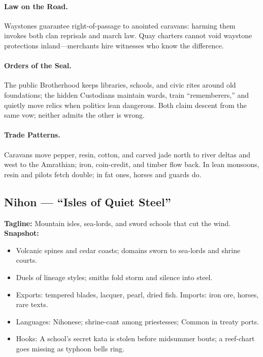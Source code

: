 \documentclass[11pt]{book}
\begin{document}
\paragraph{Law on the Road.}
Waystones guarantee right-of-passage to anointed caravans: harming them invokes both clan reprisals and march law. Quay charters cannot void waystone protections inland—merchants hire witnesses who know the difference.

\paragraph{Orders of the Seal.}
The public Brotherhood keeps libraries, schools, and civic rites around old foundations; the hidden Custodians maintain wards, train “rememberers,” and quietly move relics when politics lean dangerous. Both claim descent from the same vow; neither admits the other is wrong.

\paragraph{Trade Patterns.}
Caravans move pepper, resin, cotton, and carved jade north to river deltas and west to the Amrathian; iron, coin-credit, and timber flow back. In lean monsoons, resin and pilots fetch double; in fat ones, horses and guards do.

\subsection*{Nihon — “Isles of Quiet Steel”}
\textbf{Tagline:} Mountain isles, sea-lords, and sword schools that cut the wind.\\
\textbf{Snapshot:}
\begin{itemize}
  \item Volcanic spines and cedar coasts; domains sworn to sea-lords and shrine courts.
  \item Duels of lineage styles; smiths fold storm and silence into steel.
  \item Exports: tempered blades, lacquer, pearl, dried fish. Imports: iron ore, horses, rare texts.
  \item Languages: Nihonese; shrine-cant among priestesses; Common in treaty ports.
  \item Hooks: A school’s secret kata is stolen before midsummer bouts; a reef-chart goes missing as typhoon bells ring.
\end{itemize}
\end{document}
